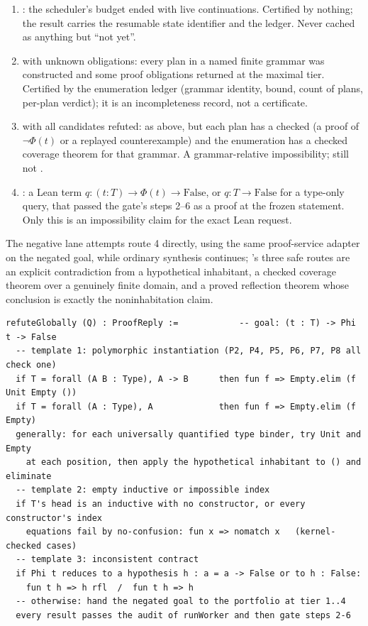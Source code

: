 \begin{enumerate}
\item {}: the scheduler's budget ended with live continuations. Certified by nothing; the result carries the resumable state identifier and the ledger. Never cached as anything but ``not yet''.
\item {} with unknown obligations: every plan in a named finite grammar was constructed and some proof obligations returned  at the maximal tier. Certified by the enumeration ledger (grammar identity, bound, count of plans, per-plan verdict); it is an incompleteness record, not a certificate.
\item {} with all candidates refuted: as above, but each plan has a checked  (a proof of $\neg\Phi(t)$ or a replayed counterexample) and the enumeration has a checked coverage theorem for that grammar. A grammar-relative impossibility; still not .
\item {}: a Lean term $q : (t : T) \to \Phi(t) \to \mathrm{False}$, or $q : T \to \mathrm{False}$ for a type-only query, that passed the gate's steps 2--6 as a proof at the frozen statement. Only this is an impossibility claim for the exact Lean request.
\end{enumerate}

The negative lane attempts route 4 directly, using the same proof-service adapter on the negated goal, while ordinary synthesis continues; 's three safe routes are an explicit contradiction from a hypothetical inhabitant, a checked coverage theorem over a genuinely finite domain, and a proved reflection theorem whose conclusion is exactly the noninhabitation claim.
\begin{lstlisting}
refuteGlobally (Q) : ProofReply :=            -- goal: (t : T) -> Phi t -> False
  -- template 1: polymorphic instantiation (P2, P4, P5, P6, P7, P8 all check one)
  if T = forall (A B : Type), A -> B      then fun f => Empty.elim (f Unit Empty ())
  if T = forall (A : Type), A             then fun f => Empty.elim (f Empty)
  generally: for each universally quantified type binder, try Unit and Empty
    at each position, then apply the hypothetical inhabitant to () and eliminate
  -- template 2: empty inductive or impossible index
  if T's head is an inductive with no constructor, or every constructor's index
    equations fail by no-confusion: fun x => nomatch x   (kernel-checked cases)
  -- template 3: inconsistent contract
  if Phi t reduces to a hypothesis h : a = a -> False or to h : False:
    fun t h => h rfl  /  fun t h => h
  -- otherwise: hand the negated goal to the portfolio at tier 1..4
  every result passes the audit of runWorker and then gate steps 2-6
\end{lstlisting}

